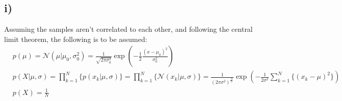 \documentclass[11pt]{scrartcl} %
\begin{document}
         
         \subsection*{i)}
         Assuming the samples aren't correlated to each other, and following the central limit theorem, the following is to be assumed:
         \begin{equation}\label{eq:2}
           \begin{split}
             &p(\mu) = \mathcal{N}(\mu|\mu_0, \sigma_0^2) = \frac{1}{\sqrt{2\pi\sigma_0^2}} \exp\left(-\frac{1}{2}\frac{(x-\mu_0)^2}{\sigma_0^2} \right)\\
             &p(X|\mu, \sigma) = \prod_{k=1}^N\{p(x_k|\mu, \sigma)\} = \prod_{k=1}^N\{\mathcal{N}(x_k|\mu, \sigma)\} = \frac{1}{(2\pi\sigma^2)^{\frac{N}{2}}}\exp\left(-\frac{1}{2\sigma^2}\sum_{k=1}^N\{(x_k-\mu)^2\}\right)\\
             &p(X) = \frac{1}{N}\\
           \end{split}
         \end{equation}
\end{document}

